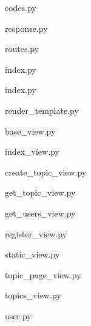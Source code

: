

codes.py


response.py


routes.py


index.py


index.py


render\_template.py


base\_view.py


index\_view.py


create\_topic\_view.py


get\_topic\_view.py


get\_users\_view.py


register\_view.py


static\_view.py


topic\_page\_view.py


topics\_view.py


user.py



